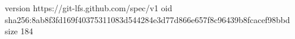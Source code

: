 version https://git-lfs.github.com/spec/v1
oid sha256:8ab8f3fd169f40375311083d544284e3d77d866e657f8c96439b8fcacef98bbd
size 184
